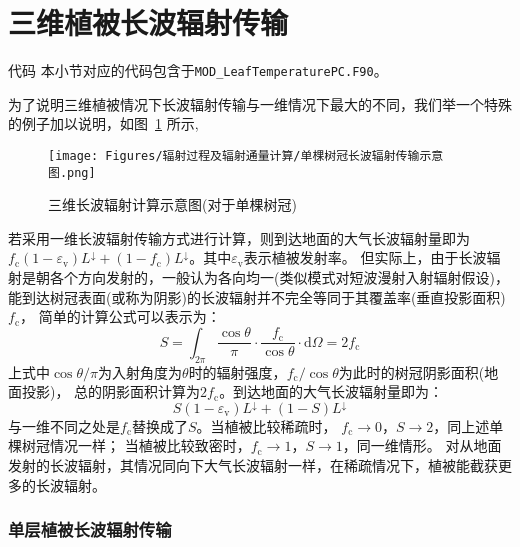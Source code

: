 \section{三维植被长波辐射传输}\label{三维植被长波辐射传输}
\begin{mymdframed}{代码}
  本小节对应的代码包含于\texttt{MOD\_LeafTemperaturePC.F90}。
\end{mymdframed}

为了说明三维植被情况下长波辐射传输与一维情况下最大的不同，我们举一个特殊的例子加以说明，如图~\ref{fig:单棵树冠长波辐射传输示意图} 所示,
{
  \begin{figure}[htb]
    \centering
    \texttt{[image: Figures/辐射过程及辐射通量计算/单棵树冠长波辐射传输示意图.png]}
    \caption{三维长波辐射计算示意图(对于单棵树冠)}
    \label{fig:单棵树冠长波辐射传输示意图}
  \end{figure}
}
%
若采用一维长波辐射传输方式进行计算，则到达地面的大气长波辐射量即为$f_{\mathrm {c}}\left(1-\varepsilon_{\mathrm v}\right)L^\downarrow+\left(1-f_{\mathrm {c}}\right)L^\downarrow$。其中$\varepsilon_{\mathrm v}$表示植被发射率。
但实际上，由于长波辐射是朝各个方向发射的，一般认为各向均一(类似模式对短波漫射入射辐射假设)，能到达树冠表面(或称为阴影)的长波辐射并不完全等同于其覆盖率(垂直投影面积)$f_{\mathrm {c}}$，
简单的计算公式可以表示为：
\begin{equation}
  S=\int_{2 \pi} \frac{\cos \theta}{\pi} \cdot \frac{f_{\mathrm{c}}}{\cos \theta} \cdot {\mathrm d} \Omega=2 f_{\mathrm{c}}
\end{equation}
上式中$\cos{\theta}/\pi$为入射角度为$\theta$时的辐射强度，$f_{\mathrm {c}}/\cos{\theta}$为此时的树冠阴影面积(地面投影)，
总的阴影面积计算为$2f_{\mathrm {c}}$。到达地面的大气长波辐射量即为：
\begin{equation}
  S\left(1-\varepsilon_{\mathrm{v}}\right) L ^\downarrow+(1-S) L ^\downarrow
\end{equation}
与一维不同之处是$f_{\mathrm {c}}$替换成了$S$。当植被比较稀疏时，
$f_{\mathrm {c}}\rightarrow0$，$S\rightarrow2$，同上述单棵树冠情况一样；
当植被比较致密时，$f_{\mathrm {c}}\rightarrow1$，$S\rightarrow1$，同一维情形。
对从地面发射的长波辐射，其情况同向下大气长波辐射一样，在稀疏情况下，植被能截获更多的长波辐射。

\subsubsection{单层植被长波辐射传输}

